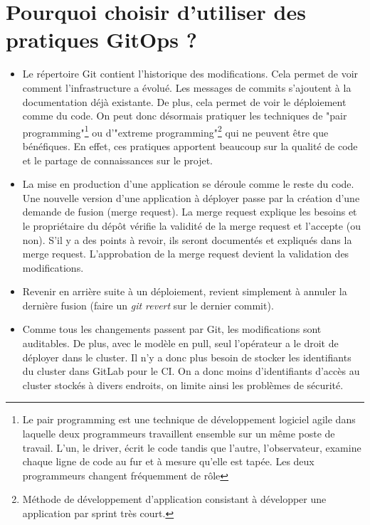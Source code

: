 \documentclass[11pt,fleqn]{book} %
\begin{document}
\section{Pourquoi choisir d'utiliser des pratiques GitOps ? }
\begin{itemize}
    \item Le répertoire Git contient l'historique des modifications. Cela permet de voir comment l'infrastructure a évolué. Les messages de commits s'ajoutent à la documentation déjà existante. De plus, cela permet de voir le déploiement comme du code. On peut donc désormais pratiquer les techniques de "pair programming"\footnote{Le pair programming est une technique de développement logiciel agile dans laquelle deux programmeurs travaillent ensemble sur un même poste de travail. L'un, le driver, écrit le code tandis que l'autre, l'observateur, examine chaque ligne de code au fur et à mesure qu'elle est tapée. Les deux programmeurs changent fréquemment de rôle
} ou d'"extreme programming"\footnote{Méthode de développement d'application consistant à développer une application par sprint très court.} qui ne peuvent être que bénéfiques. En effet, ces pratiques apportent beaucoup sur la qualité de code et le partage de connaissances sur le projet.
    \item La mise en production d'une application se déroule comme le reste du code. Une nouvelle version d'une application à déployer passe par la création d'une demande de fusion (merge request). La merge request explique les besoins et le propriétaire du dépôt vérifie la validité de la merge request et l'accepte (ou non). S’il y a des points à revoir, ils seront documentés et expliqués dans la merge request. L’approbation de la merge request devient la validation des modifications.
    \item Revenir en arrière suite à un déploiement, revient simplement à annuler la dernière fusion (faire un \textit{git revert} sur le dernier commit).
    \item Comme tous les changements passent par Git, les modifications sont auditables. De plus, avec le  modèle en pull, seul l’opérateur a le droit de déployer dans le cluster. Il n'y a donc plus besoin de stocker les identifiants du cluster dans GitLab pour le CI. On a donc moins d'identifiants d'accès au cluster stockés à divers endroits, on limite ainsi les problèmes de sécurité.
\end{itemize}
\end{document}
